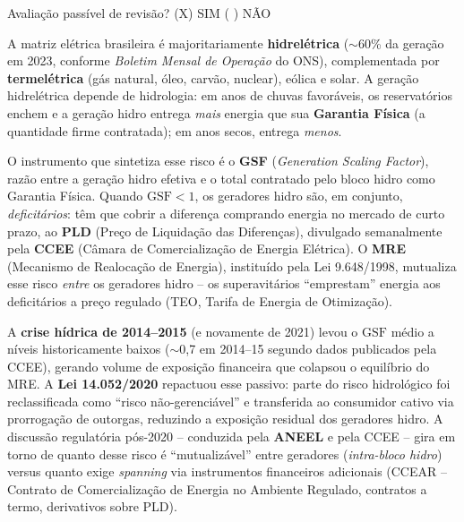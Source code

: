 \documentclass[11pt,addpoints]{exam}
\newcommand{\GSF}{\text{GSF}}
\begin{document}
    \vspace{0.6em}
    \noindent Avaliação passível de revisão? \hfill (X) SIM \quad (   ) NÃO

    \newpage
\fi

\begin{contextbox}
\small
A matriz elétrica brasileira é majoritariamente \textbf{hidrelétrica} ($\sim$60\% da geração em 2023, conforme \emph{Boletim Mensal de Operação} do ONS), complementada por \textbf{termelétrica} (gás natural, óleo, carvão, nuclear), eólica e solar. A geração hidrelétrica depende de hidrologia: em anos de chuvas favoráveis, os reservatórios enchem e a geração hidro entrega \emph{mais} energia que sua \textbf{Garantia Física} (a quantidade firme contratada); em anos secos, entrega \emph{menos}.

O instrumento que sintetiza esse risco é o \textbf{GSF} (\emph{Generation Scaling Factor}), razão entre a geração hidro efetiva e o total contratado pelo bloco hidro como Garantia Física. Quando $\GSF < 1$, os geradores hidro são, em conjunto, \emph{deficitários}: têm que cobrir a diferença comprando energia no mercado de curto prazo, ao \textbf{PLD} (Preço de Liquidação das Diferenças), divulgado semanalmente pela \textbf{CCEE} (Câmara de Comercialização de Energia Elétrica). O \textbf{MRE} (Mecanismo de Realocação de Energia), instituído pela Lei 9.648/1998, mutualiza esse risco \emph{entre} os geradores hidro -- os superavitários ``emprestam'' energia aos deficitários a preço regulado (TEO, Tarifa de Energia de Otimização).

A \textbf{crise hídrica de 2014--2015} (e novamente de 2021) levou o $\GSF$ médio a níveis historicamente baixos ($\sim$0,7 em 2014--15 segundo dados publicados pela CCEE), gerando volume de exposição financeira que colapsou o equilíbrio do MRE. A \textbf{Lei 14.052/2020} repactuou esse passivo: parte do risco hidrológico foi reclassificada como ``risco não-gerenciável'' e transferida ao consumidor cativo via prorrogação de outorgas, reduzindo a exposição residual dos geradores hidro. A discussão regulatória pós-2020 -- conduzida pela \textbf{ANEEL} e pela CCEE -- gira em torno de quanto desse risco é ``mutualizável'' entre geradores (\emph{intra-bloco hidro}) versus quanto exige \emph{spanning} via instrumentos financeiros adicionais (CCEAR -- Contrato de Comercialização de Energia no Ambiente Regulado, contratos a termo, derivativos sobre PLD).


\end{contextbox}
\end{document}
